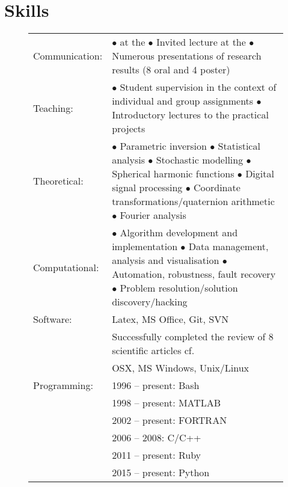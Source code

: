 \documentclass[a4paper]{article}
\newcommand{\dynhref}[2]{%
  \iftoggle{expliciturl}{%
    #2 (\href{#1}{\texttt{\detokenize{#1}}})%
  }{%
    \href{#1}{#2}%
  }%
}
\newcommand{\procv}[2]{\iftoggle{professionalcv}{#1}{#2}}
\newlength{\listskipbig}
\newenvironment{cvsection}[2]{
  \setlength{\floatsep}{0pt}
  \setlength{\textfloatsep}{0pt}
  \setlength{\intextsep}{0pt}
  \section*{#1}
  \begin{figure}[H]
  \begin{longtable}{lp{#2}}
}{
  \end{longtable}
  \end{figure}
}
\begin{document}
\begin{cvsection}{Skills}{11.2cm}
Communication:  & $\bullet$ \dynhref{http://tinyurl.com/h928s3c}{Invited talk} at the \dynhref{http://fallmeeting.agu.org/2015/}{American Geophysical Union Fall Meeting in 2015}\newline
                  $\bullet$ Invited lecture at the \dynhref{http://data-assimilation.com}{Summer School on Data Assimilation and its applications in Oceanography, Hydrology, Risk \& Safety and Reservoir Engineering in 2017}\newline
                  $\bullet$ Numerous presentations of research results (8 oral and 4 poster)\\[\listskipbig]

Teaching:      & $\bullet$ Student supervision in the context of individual and group assignments\newline
                 $\bullet$ Introductory lectures to the practical projects\\[\listskipbig]

Theoretical:   & $\bullet$ Parametric inversion\newline
                 $\bullet$ Statistical analysis\newline
                 $\bullet$ Stochastic modelling\newline
                 $\bullet$ Spherical harmonic functions\newline
                 $\bullet$ Digital signal processing\newline
                 $\bullet$ Coordinate transformations\slash quaternion arithmetic\newline
                 $\bullet$ Fourier analysis\\[\listskipbig]

Computational:  & $\bullet$ Algorithm development and implementation\newline
                  $\bullet$ Data management, analysis and visualisation\newline
                  $\bullet$ Automation, robustness, fault recovery\newline
                  $\bullet$ Problem resolution\slash solution discovery\slash hacking\\[\listskipbig]

Software: & Latex, MS Office, Git, SVN\\[\listskipbig]
\procv{}{
Articles review: & Successfully completed the review of 8 scientific articles cf. \dynhref{https://publons.com/a/782170/}{Publons}\\[\listskipbig]
}

Operating Systems: & OSX, MS Windows, Unix/Linux \\[\listskipbig]

Programming:
& 1996 -- present: Bash \\
& 1998 -- present: MATLAB \\
& 2002 -- present: FORTRAN \\
& 2006 -- 2008: C/C++ \\
& 2011 -- present: Ruby \\
& 2015 -- present: Python\\[\listskipbig]
\end{cvsection}
\end{document}
